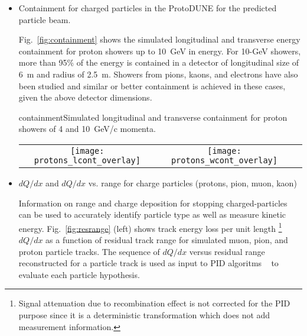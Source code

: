 \begin{itemize}
\item Containment for charged particles in the ProtoDUNE for the predicted particle beam. 

Fig.~\ref{fig:containment} shows the simulated longitudinal and transverse 
energy containment for proton showers up to 10~GeV in energy.
For 10-GeV showers, more than 95\% of the energy is contained in a detector of longitudinal size of 6~m and 
radius of 2.5~m. Showers from pions, kaons, and electrons have also been studied and similar or better containment is achieved in these cases, given the above detector dimensions.


\begin{cdrfigure}{containment}{Simulated longitudinal and transverse containment for proton showers of 4 and 10~GeV/c momenta.}
  \begin{tabular}{ccc}
   \texttt{[image: protons\_lcont\_overlay]}&
   \texttt{[image: protons\_wcont\_overlay]}\\
  \end{tabular}
\end{cdrfigure}

\item $dQ/dx$ and $dQ/dx$ vs. range for charge particles (protons, pion, muon, kaon)


Information on range and charge deposition for stopping charged-particles can be used to accurately identify particle type as well as measure kinetic energy. Fig.~\ref{fig:resrange}  (left) shows track energy loss per unit length \footnote{Signal attenuation due to recombination effect is not corrected for the PID purpose since it is a deterministic transformation which does not add measurement information.} $dQ/dx$ as a function of residual track range for simulated muon, pion, and proton particle tracks. The sequence of $dQ/dx$ versus residual range reconstructed for a particle track is used as input to PID algoritms ~\cite{nn_pid,rd_pid} to evaluate each particle hypothesis.


\end{itemize}

